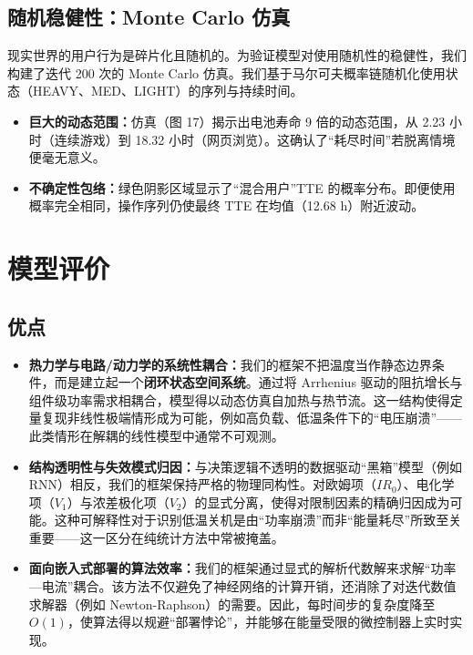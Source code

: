 \documentclass[11pt,a4paper]{ctexart}
\begin{document}
\subsection{随机稳健性：Monte Carlo 仿真}

现实世界的用户行为是碎片化且随机的。为验证模型对使用随机性的稳健性，我们构建了迭代 200 次的 Monte Carlo 仿真。我们基于马尔可夫概率链随机化使用状态（HEAVY、MED、LIGHT）的序列与持续时间。

\begin{itemize}[leftmargin=1.6em,itemsep=0.3em]
\item \textbf{巨大的动态范围：}仿真（图 17）揭示出电池寿命 9 倍的动态范围，从 2.23 小时（连续游戏）到 18.32 小时（网页浏览）。这确认了“耗尽时间”若脱离情境便毫无意义。
\item \textbf{不确定性包络：}绿色阴影区域显示了“混合用户”TTE 的概率分布。即便使用概率完全相同，操作序列仍使最终 TTE 在均值（12.68 h）附近波动。
\end{itemize}

\section{模型评价}

\subsection{优点}

\begin{itemize}[leftmargin=1.6em,itemsep=0.4em]
\item \textbf{热力学与电路/动力学的系统性耦合：}我们的框架不把温度当作静态边界条件，而是建立起一个\textbf{闭环状态空间系统}。通过将 Arrhenius 驱动的阻抗增长与组件级功率需求相耦合，模型得以动态仿真自加热与热节流。这一结构使得定量复现非线性极端情形成为可能，例如高负载、低温条件下的“电压崩溃”——此类情形在解耦的线性模型中通常不可观测。
\item \textbf{结构透明性与失效模式归因：}与决策逻辑不透明的数据驱动“黑箱”模型（例如 RNN）相反，我们的框架保持严格的物理同构性。对欧姆项（$IR_0$）、电化学项（$V_1$）与浓差极化项（$V_2$）的显式分离，使得对限制因素的精确归因成为可能。这种可解释性对于识别低温关机是由“功率崩溃”而非“能量耗尽”所致至关重要——这一区分在纯统计方法中常被掩盖。
\item \textbf{面向嵌入式部署的算法效率：}我们的框架通过显式的解析代数解来求解“功率—电流”耦合。该方法不仅避免了神经网络的计算开销，还消除了对迭代数值求解器（例如 Newton-Raphson）的需要。因此，每时间步的复杂度降至 $O(1)$，使算法得以规避“部署悖论”，并能够在能量受限的微控制器上实时实现。
\end{itemize}
\end{document}
